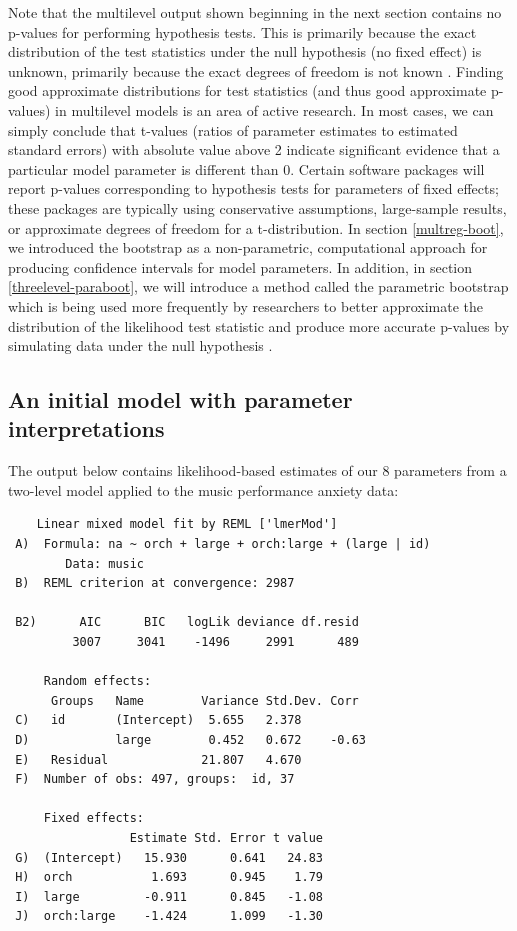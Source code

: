 \documentclass[
]{krantz}
\begin{document}
Note that the multilevel output shown beginning in the next section contains no p-values for performing hypothesis tests. This is primarily because the exact distribution of the test statistics under the null hypothesis (no fixed effect) is unknown, primarily because the exact degrees of freedom is not known \citep{Bates2015}. Finding good approximate distributions for test statistics (and thus good approximate p-values) in multilevel models is an area of active research. In most cases, we can simply conclude that t-values (ratios of parameter estimates to estimated standard errors) with absolute value above 2 indicate significant evidence that a particular model parameter is different than 0. Certain software packages will report p-values corresponding to hypothesis tests for parameters of fixed effects; these packages are typically using conservative assumptions, large-sample results, or approximate degrees of freedom for a t-distribution. In section \ref{multreg-boot}, we introduced the bootstrap as a non-parametric, computational approach for producing confidence intervals for model parameters. In addition, in section \ref{threelevel-paraboot}, we will introduce a method called the parametric bootstrap which is being used more frequently by researchers to better approximate the distribution of the likelihood test statistic and produce more accurate p-values by simulating data under the null hypothesis \citep{Efron2012}.

\hypertarget{initialmodel}{%
\subsection{An initial model with parameter interpretations}\label{initialmodel}}

The output below contains likelihood-based estimates of our 8 parameters from a two-level model applied to the music performance anxiety data:

\begin{verbatim}
    Linear mixed model fit by REML ['lmerMod'] 
 A)  Formula: na ~ orch + large + orch:large + (large | id) 
        Data: music 
 B)  REML criterion at convergence: 2987 
      
 B2)      AIC      BIC   logLik deviance df.resid  
         3007     3041    -1496     2991      489  
      
     Random effects: 
      Groups   Name        Variance Std.Dev. Corr  
 C)   id       (Intercept)  5.655   2.378          
 D)            large        0.452   0.672    -0.63 
 E)   Residual             21.807   4.670          
 F)  Number of obs: 497, groups:  id, 37 
      
     Fixed effects: 
                 Estimate Std. Error t value 
 G)  (Intercept)   15.930      0.641   24.83 
 H)  orch           1.693      0.945    1.79 
 I)  large         -0.911      0.845   -1.08 
 J)  orch:large    -1.424      1.099   -1.30
\end{verbatim}
\end{document}
